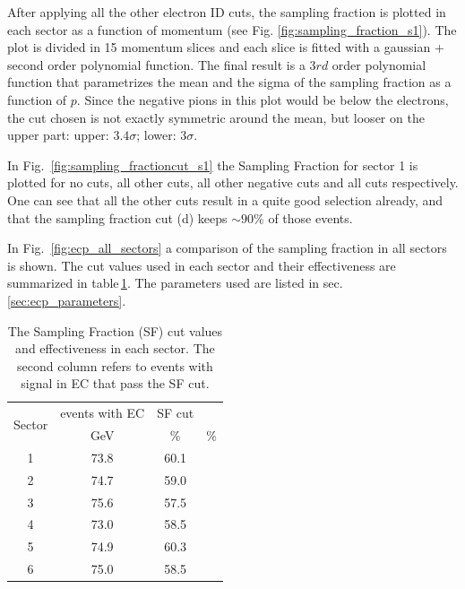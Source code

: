 After applying all the other electron ID cuts, the sampling fraction is plotted in each sector
as a function of momentum (see Fig. \ref{fig:sampling_fraction_s1}). 
The plot is divided in 15 momentum slices
and each slice is fitted with a gaussian + second order polynomial function. The final result
is a $3rd$ order polynomial function that parametrizes the mean and the sigma of the 
sampling fraction as a function of $p$.
Since the negative pions in this plot would be below the electrons, the cut chosen is not exactly
symmetric around the mean, but looser on the upper part: upper: $3.4\sigma$; lower: $3\sigma$.

In Fig.~\ref{fig:sampling_fractioncut_s1} the Sampling Fraction for sector 1 is plotted for
no cuts, all other cuts, all other negative cuts and all cuts respectively. One can see 
that all the other cuts result in a quite good selection already, and that the sampling 
fraction cut (d) keeps  $\sim 90\%$ of those events.

In Fig.~\ref{fig:ecp_all_sectors} a comparison of the sampling fraction in all sectors is shown.
The cut values used in each sector and their effectiveness are summarized in 
table\,\ref{tab:sfcut}. The parameters used are listed in sec.\ref{sec:ecp_parameters}.

\begin{table}[h]
\label{tab:sfcut}
	\begin{center}
		\begin{tabular}{c | c | c | c}
			\hline 
			\multirow{2}{*}{Sector} 
					& events with EC & SF cut\\
					&  GeV & \% & \% \\
			\hline
			1   & 73.8 & 60.1 \\
			2   & 74.7 & 59.0 \\
			3   & 75.6 & 57.5 \\
			4   & 73.0 & 58.5 \\
			5   & 74.9 & 60.3 \\
			6   & 75.0 & 58.5 \\
			\hline 
		\end{tabular}
		\caption{The Sampling Fraction (SF) cut values and effectiveness in each sector.
					The second column refers to events with signal in EC that pass the SF cut.}	
	\end{center}
\end{table}


